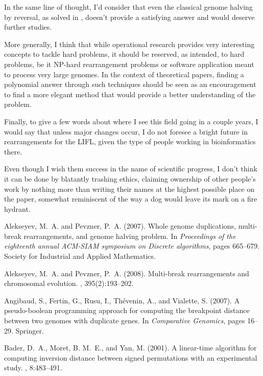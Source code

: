 \documentclass[11pt,final,twoside,nofrench]{thlifl}
\begin{document}
{In the same line of thought, I'd consider that even the classical genome halving by reversal, as solved in \cite{Mabrouk98}, doesn't provide a satisfying answer and would deserve further studies.

More generally, I think that while operational research provides very interesting concepts to tackle hard problems, it should be reserved, as intended, to hard problems, be it NP-hard rearrangement problems or software application meant to process very large genomes. In the context of theoretical papers, finding a polynomial answer through such techniques should be seen as an encouragement to find a more elegant method that would provide a better understanding of the problem.

Finally, to give a few words about where I see this field going in a couple years, I would say that unless major changes occur, I do not foresee a bright future in rearrangements for the LIFL, given the type of people working in bioinformatics there.

Even though I wish them success in the name of scientific progress, I don't think it can be done by blatantly trashing ethics, claiming ownership of other people's work by nothing more than writing their names at the highest possible place on the paper, somewhat reminiscent of the way a dog would leave its mark on a fire hydrant.

\begin{thebibliography}{}

Alekseyev, M.~A. and Pevzner, P.~A. (2007).
\newblock Whole genome duplications, multi-break rearrangements, and genome
  halving problem.
\newblock In {\em Proceedings of the eighteenth annual ACM-SIAM symposium on
  Discrete algorithms}, pages 665--679. Society for Industrial and Applied
  Mathematics.

Alekseyev, M.~A. and Pevzner, P.~A. (2008).
\newblock Multi-break rearrangements and chromosomal evolution.
, 395(2):193--202.

Angibaud, S., Fertin, G., Rusu, I., Th{\'e}venin, A., and Vialette, S. (2007).
\newblock A pseudo-boolean programming approach for computing the breakpoint
  distance between two genomes with duplicate genes.
\newblock In {\em Comparative Genomics}, pages 16--29. Springer.

Bader, D.~A., Moret, B. M.~E., and Yan, M. (2001).
\newblock A linear-time algorithm for computing inversion distance between
  signed permutations with an experimental study.
, 8:483--491.


\end{thebibliography}}
\end{document}
